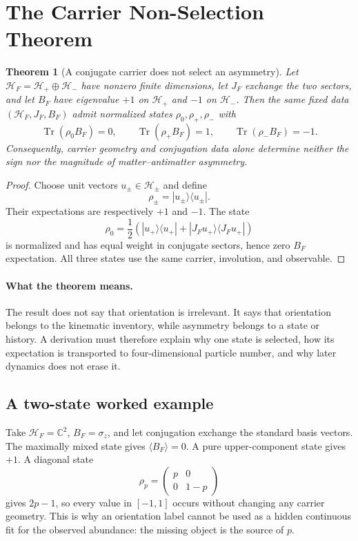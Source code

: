 \documentclass[11pt]{article}
\newtheorem{theorem}{Theorem}
\theoremstyle{definition}
\theoremstyle{remark}
\begin{document}
\section{The Carrier Non-Selection Theorem}

\begin{theorem}[A conjugate carrier does not select an asymmetry]
\label{thm:carrier-nonselection}
Let $\mathcal H_F=\mathcal H_+\oplus\mathcal H_-$ have nonzero finite
dimensions, let $J_F$ exchange the two sectors, and let $B_F$ have eigenvalue
$+1$ on $\mathcal H_+$ and $-1$ on $\mathcal H_-$.  Then the same fixed data
$(\mathcal H_F,J_F,B_F)$ admit normalized states $\rho_0,\rho_+,\rho_-$ with
\[
 \operatorname{Tr}(\rho_0 B_F)=0,\qquad
 \operatorname{Tr}(\rho_+ B_F)=1,\qquad
 \operatorname{Tr}(\rho_- B_F)=-1.
\]
Consequently, carrier geometry and conjugation data alone determine neither
the sign nor the magnitude of matter--antimatter asymmetry.
\end{theorem}

\begin{proof}
Choose unit vectors $u_\pm\in\mathcal H_\pm$ and define
\[
 \rho_\pm=|u_\pm\rangle\langle u_\pm|.
\]
Their expectations are respectively $+1$ and $-1$.  The state
\[
 \rho_0=\frac12
 \left(
 |u_+\rangle\langle u_+|
 +
 |J_Fu_+\rangle\langle J_Fu_+|
 \right)
\]
is normalized and has equal weight in conjugate sectors, hence zero
$B_F$ expectation.  All three states use the same carrier, involution, and
observable.
\end{proof}

\paragraph{What the theorem means.}
The result does not say that orientation is irrelevant.  It says that
orientation belongs to the kinematic inventory, while asymmetry belongs to a
state or history.  A derivation must therefore explain why one state is
selected, how its expectation is transported to four-dimensional particle
number, and why later dynamics does not erase it.

\subsection{A two-state worked example}

Take $\mathcal H_F=\mathbb C^2$, $B_F=\sigma_z$, and let conjugation exchange
the standard basis vectors.  The maximally mixed state gives
$\langle B_F\rangle=0$.  A pure upper-component state gives $+1$.  A diagonal
state
\[
 \rho_p=
 \begin{pmatrix}
 p&0\\0&1-p
 \end{pmatrix}
\]
gives $2p-1$, so every value in $[-1,1]$ occurs without changing any carrier
geometry.  This is why an orientation label cannot be used as a hidden
continuous fit for the observed abundance: the missing object is the source
of $p$.
\end{document}
